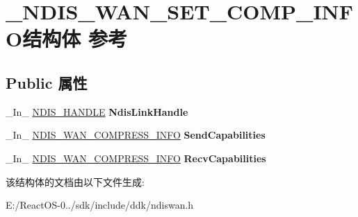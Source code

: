 \hypertarget{struct___n_d_i_s___w_a_n___s_e_t___c_o_m_p___i_n_f_o}{}\section{\+\_\+\+N\+D\+I\+S\+\_\+\+W\+A\+N\+\_\+\+S\+E\+T\+\_\+\+C\+O\+M\+P\+\_\+\+I\+N\+F\+O结构体 参考}
\label{struct___n_d_i_s___w_a_n___s_e_t___c_o_m_p___i_n_f_o}
\subsection*{Public 属性}
\begin{DoxyCompactItemize}
\item 
\mbox{\label{struct___n_d_i_s___w_a_n___s_e_t___c_o_m_p___i_n_f_o_a9c384ad2d3e7092e868622b39c3ce75e}} 
\+\_\+\+In\+\_\+ \hyperlink{interfacevoid}{N\+D\+I\+S\+\_\+\+H\+A\+N\+D\+LE} {\bfseries Ndis\+Link\+Handle}
\item 
\mbox{\label{struct___n_d_i_s___w_a_n___s_e_t___c_o_m_p___i_n_f_o_ab024ab795c6222052afc13dd89b65098}} 
\+\_\+\+In\+\_\+ \hyperlink{struct___n_d_i_s___w_a_n___c_o_m_p_r_e_s_s___i_n_f_o}{N\+D\+I\+S\+\_\+\+W\+A\+N\+\_\+\+C\+O\+M\+P\+R\+E\+S\+S\+\_\+\+I\+N\+FO} {\bfseries Send\+Capabilities}
\item 
\mbox{\label{struct___n_d_i_s___w_a_n___s_e_t___c_o_m_p___i_n_f_o_a615b990764401f40995906d51d25ce5f}} 
\+\_\+\+In\+\_\+ \hyperlink{struct___n_d_i_s___w_a_n___c_o_m_p_r_e_s_s___i_n_f_o}{N\+D\+I\+S\+\_\+\+W\+A\+N\+\_\+\+C\+O\+M\+P\+R\+E\+S\+S\+\_\+\+I\+N\+FO} {\bfseries Recv\+Capabilities}
\end{DoxyCompactItemize}


该结构体的文档由以下文件生成\+:\begin{DoxyCompactItemize}
\item 
E\+:/\+React\+O\+S-\/0../sdk/include/ddk/ndiswan.\+h\end{DoxyCompactItemize}
